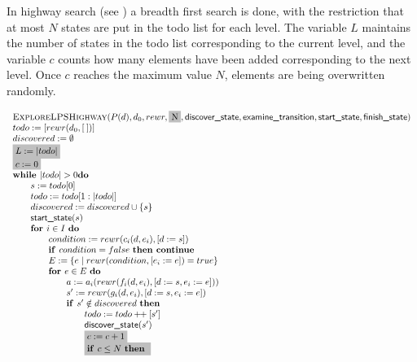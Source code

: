 \documentclass{article}
\newcommand{\concat}{\ensuremath{+\!\!+\:}}
\newcommand{\Space}{\text{\ }}
\newcommand{\If}{\text{\textbf{if }}}
\newcommand{\Do}{\text{\textbf{do }}}
\newcommand{\Then}{\text{\textbf{then }}}
\newcommand{\For}{\text{\textbf{for }}}
\newcommand{\While}{\text{\textbf{while }}}
\newcommand{\Continue}{\text{\textbf{continue }}}
\begin{document}
In highway search (see \cite{DBLP:journals/jlp/EngelsGWW09}) a breadth first search is done, with the restriction that at most $N$ states are put in the todo list for each level. The variable $L$ maintains the number of states in the todo list corresponding to the current level, and the variable $c$ counts how many elements have been added corresponding to the next level. Once $c$ reaches the maximum value $N$,  elements are being overwritten randomly.

\[
\begin{tabular}{l}
\textsc{ExploreLPSHighway}($P(d), d_0, rewr, \colorbox{lightgray}{N}, \textsf{discover\_state}, \textsf{examine\_transition},
\textsf{start\_state}, \textsf{finish\_state})$ \\
$todo := [rewr(d_0, [\:])]$ \\
$discovered := \emptyset$ \\
\colorbox{lightgray}{$L := |todo|$} \\
\colorbox{lightgray}{$c := 0$} \\
$\While |todo| > 0 \Do$ \\
\qquad $s := todo[0]$ \\
\qquad $todo := todo[1:|todo|]$ \\
\qquad $discovered := discovered \cup \{s\}$ \\
\qquad $\textsf{start\_state}(s)$ \\
\qquad $\For i \in I  \Space \Do$ \\
\qquad \qquad $condition := rewr(c_i(d, e_i), [d := s])$ \\
\qquad \qquad $\If condition = false  \Space \Then \Continue$ \\
\qquad \qquad $E := \{ e \mid rewr(condition, [e_i := e]) = true \}$ \\
\qquad \qquad $\For e \in E  \Space \Do$ \\
\qquad \qquad \qquad $a := a_i(rewr(f_i(d,e_i), [d:=s,e_i:=e]))$ \\
\qquad \qquad \qquad $s' := rewr(g_i(d,e_i), [d:=s,e_i:=e])$ \\
\qquad \qquad \qquad $\If s' \notin discovered \Space \Then$ \\
\qquad \qquad \qquad \qquad $todo := todo \concat [s']$ \\
\qquad \qquad \qquad \qquad $\textsf{discover\_state}(s')$ \\
\qquad \qquad \qquad \qquad \colorbox{lightgray}{$c := c + 1$} \\
\qquad \qquad \qquad \qquad \colorbox{lightgray}{\If $c \leq N$ \Then} \\

\end{tabular}\]
\end{document}
